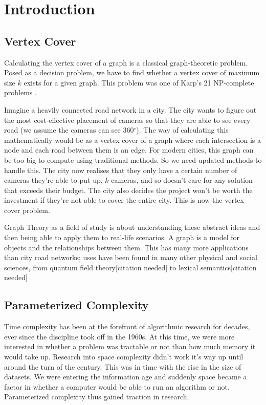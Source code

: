 \section{Introduction}

\subsection{Vertex Cover}

Calculating the vertex cover of a graph is a classical graph-theoretic problem.
Posed as a decision problem, we have to find whether a vertex cover of maximum
size \(k\) exists for a given graph. This problem was one of Karp's 21
NP-complete problems \cite{karp1972reducibility}.

Imagine a heavily connected road network in a city. The city wants to figure
out the most cost-effective placement of cameras so that they are able to see
every road (we assume the cameras can see 360\(^\circ\)). The way of
calculating this mathematically would be as a vertex cover of a graph where
each intersection is a node and each road between them is an edge. For modern
cities, this graph can be too big to compute using traditional methods. So we
need updated methods to handle this. The city now realises that they only have
a certain number of cameras they're able to put up, \(k\) cameras, and so
doesn't care for any solution that exceeds their budget. The city also decides
the project won't be worth the investment if they're not able to cover the
entire city. This is now the vertex cover problem.

Graph Theory as a field of study is about understanding these abstract ideas
and then being able to apply them to real-life scenarios. A graph is a model
for objects and the relationships between them. This has many more applications
than city road networks; uses have been found in many other physical and social
sciences, from quantum field theory{[}citation needed{]} to lexical
semantics{[}citation needed{]}

\subsection{Parameterized Complexity}

Time complexity has been at the forefront of algorithmic research for decades,
ever since the discipline took off in the 1960s. At this time, we were more
interested in whether a problem was tractable or not than how much memory it
would take up. Research into space complexity didn't work it's way up until
around the turn of the century. This was in time with the rise in the size of
datasets. We were entering the information age and suddenly space became a
factor in whether a computer would be able to run an algorithm or not.
Parameterized complexity thus gained traction in research.

